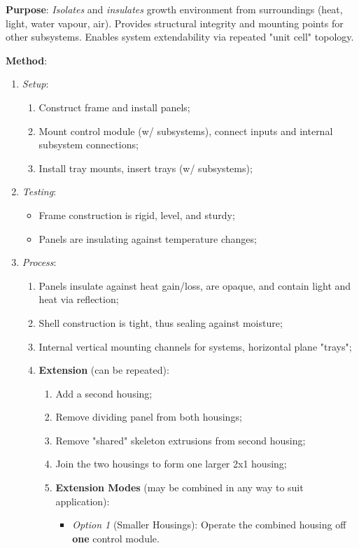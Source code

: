 \documentclass{report}
\begin{document}
\textbf{Purpose}: \textit{Isolates} and \textit{insulates} growth environment from surroundings (heat, light, water vapour, air). Provides structural integrity and mounting points for other subsystems. Enables system extendability via repeated "unit cell" topology.

\textbf{Method}:
\begin{enumerate}
    \item \textit{Setup}:
    \begin{enumerate}
        \item Construct frame and install panels;
        \item Mount control module (w/ subsystems), connect inputs and internal subsystem connections;
        \item Install tray mounts, insert trays (w/ subsystems);
    \end{enumerate}
    \item \textit{Testing}:
    \begin{itemize}
        \item Frame construction is rigid, level, and sturdy;
        \item Panels are insulating against temperature changes;
    \end{itemize}
    \item \textit{Process}:
    \begin{enumerate}
        \item Panels insulate against heat gain/loss, are opaque, and contain light and heat via reflection;
        \item Shell construction is tight, thus sealing against moisture;
        \item Internal vertical mounting channels for systems, horizontal plane "trays";
        \item \textbf{Extension} (can be repeated):
        \begin{enumerate}
            \item Add a second housing;
            \item Remove dividing panel from both housings;
            \item Remove "shared" skeleton extrusions from second housing;
            \item Join the two housings to form one larger 2x1 housing;
            \item \textbf{Extension Modes} (may be combined in any way to suit application):
            \begin{itemize}
                \item \textit{Option 1} (Smaller Housings): Operate the combined housing off \textbf{one} control module.

\end{itemize}
\end{enumerate}
\end{enumerate}
\end{enumerate}
\end{document}
